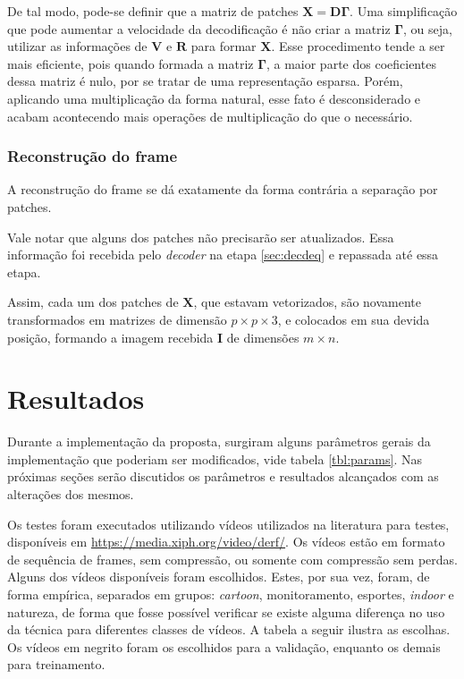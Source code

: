 \documentclass[cic,tc]{iiufrgs}
\newcommand{\mat}[1]{\bm{#1}}
\begin{document}
De tal modo, pode-se definir que a matriz de patches $\mat{X} = \mat{D} \mat{\Gamma}$.
Uma simplificação que pode aumentar a velocidade da decodificação é não criar a matriz $\mat{\Gamma}$,
ou seja, utilizar as informações de $\mat{V}$ e $\mat{R}$ para formar $\mat{X}$. 
Esse procedimento tende a ser mais eficiente, pois quando formada a matriz $\mat{\Gamma}$, 
a maior parte dos coeficientes dessa matriz é nulo, por se tratar de uma representação esparsa.
Porém, aplicando uma multiplicação da forma natural, esse fato é desconsiderado e acabam
acontecendo mais operações de multiplicação do que o necessário.

\subsection{Reconstrução do frame}
A reconstrução do frame se dá exatamente da forma contrária a separação por patches.

Vale notar que alguns dos patches não precisarão ser atualizados.
Essa informação foi recebida pelo \textit{decoder} na etapa \autoref{sec:decdeq} e repassada
até essa etapa.

Assim, cada um dos patches de $\mat{X}$, que estavam vetorizados, são novamente transformados
em matrizes de dimensão $p \times p \times 3$, e colocados em sua devida posição, formando
a imagem recebida $\mat{I}$ de dimensões $m \times n$.

\chapter{Resultados}
\label{sec:results}
Durante a implementação da proposta, surgiram alguns parâmetros gerais da implementação
que poderiam ser modificados, vide tabela \autoref{tbl:params}. 
Nas próximas seções serão discutidos os parâmetros e resultados alcançados com as 
alterações dos mesmos.

Os testes foram executados utilizando vídeos utilizados na literatura para testes,
disponíveis em \url{https://media.xiph.org/video/derf/}.
Os vídeos estão em formato de sequência de frames, sem compressão, ou somente com 
compressão sem perdas.
Alguns dos vídeos disponíveis foram escolhidos.
Estes, por sua vez, foram, de forma empírica, separados em grupos: \textit{cartoon}, 
monitoramento, esportes, \textit{indoor} e natureza, de forma que fosse possível 
verificar se existe alguma diferença no uso da técnica para diferentes classes de vídeos.
A tabela a seguir ilustra as escolhas.
Os vídeos em negrito foram os escolhidos para a validação, enquanto os demais para treinamento.
\end{document}
